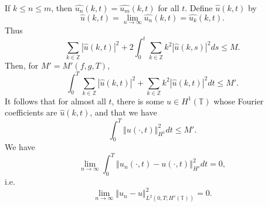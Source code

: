 \documentclass{amsart}
\newcommand{\norm}[1]{\left\Vert #1 \right\Vert}
\begin{document}
If $k \leq n \leq m$, then $\widehat{u_n}(k,t)=\widehat{u_m}(k,t)$ for all $t$. Define $\hat{u}(k,t)$ by 
\[
\hat{u}(k,t)
=\lim_{n \to \infty} \widehat{u_n}(k,t)=\widehat{u_k}(k,t).
\]
Thus
\[
\sum_{k \in \mathbb{Z}} |\hat{u}(k,t)|^2+2\int_0^t \sum_{k \in \mathbb{Z}} k^2 |\hat{u}(k,s)|^2 ds \leq M.
\]
Then, for $M'=M'(f,g,T)$,
\[
\int_0^T \sum_{k \in \mathbb{Z}} |\hat{u}(k,t)|^2+ \sum_{k \in \mathbb{Z}} k^2 |\hat{u}(k,t)|^2 dt \leq M'.
\]
It follows that for almost all $t$, there is some $u \in H^1(\mathbb{T})$ whose Fourier coefficients are $\hat{u}(k,t)$, and that we have
\[
\int_0^T \norm{u(\cdot,t)}_{H^1}^2 dt \leq M'.
\]
We have
\[
\lim_{n \to \infty} \int_0^T \norm{u_n(\cdot,t)-u(\cdot,t)}_{H^s}^2 dt=0,
\]
i.e.
\[
\lim_{n \to \infty} \norm{u_n -u}_{L^2(0,T;H^s(\mathbb{T}))}^2 = 0.
\]
\end{document}
